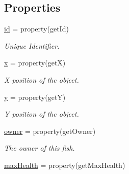 \subsection*{\-Properties}
\begin{DoxyCompactItemize}
\item 
\hypertarget{classGameObject_1_1Fish_a79f81fbfb0cddde119f293030d6e72a5}{\hyperlink{classGameObject_1_1Fish_a79f81fbfb0cddde119f293030d6e72a5}{id} = property(get\-Id)}\label{classGameObject_1_1Fish_a79f81fbfb0cddde119f293030d6e72a5}

\begin{DoxyCompactList}\small\item\em \-Unique \-Identifier. \end{DoxyCompactList}\item 
\hypertarget{classGameObject_1_1Fish_a1fe56c50eafb36dd8eb15fc92c229367}{\hyperlink{classGameObject_1_1Fish_a1fe56c50eafb36dd8eb15fc92c229367}{x} = property(get\-X)}\label{classGameObject_1_1Fish_a1fe56c50eafb36dd8eb15fc92c229367}

\begin{DoxyCompactList}\small\item\em \-X position of the object. \end{DoxyCompactList}\item 
\hypertarget{classGameObject_1_1Fish_a354116a3d86b1ed63c912f632d141e1b}{\hyperlink{classGameObject_1_1Fish_a354116a3d86b1ed63c912f632d141e1b}{y} = property(get\-Y)}\label{classGameObject_1_1Fish_a354116a3d86b1ed63c912f632d141e1b}

\begin{DoxyCompactList}\small\item\em \-Y position of the object. \end{DoxyCompactList}\item 
\hypertarget{classGameObject_1_1Fish_a98c1ce2b7664519792e2d6abfa3069fe}{\hyperlink{classGameObject_1_1Fish_a98c1ce2b7664519792e2d6abfa3069fe}{owner} = property(get\-Owner)}\label{classGameObject_1_1Fish_a98c1ce2b7664519792e2d6abfa3069fe}

\begin{DoxyCompactList}\small\item\em \-The owner of this fish. \end{DoxyCompactList}\item 
\hypertarget{classGameObject_1_1Fish_a5237681870fd309d61a0b0233818dd7b}{\hyperlink{classGameObject_1_1Fish_a5237681870fd309d61a0b0233818dd7b}{max\-Health} = property(get\-Max\-Health)}\label{classGameObject_1_1Fish_a5237681870fd309d61a0b0233818dd7b}


\end{DoxyCompactItemize}
